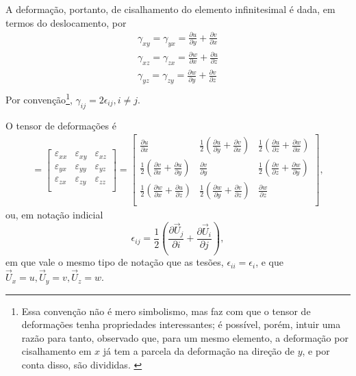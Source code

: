 A deformação, portanto, de cisalhamento do elemento infinitesimal é dada, em termos do deslocamento, por
\begin{gather}
        \gamma_{xy} = \gamma_{yx} = \frac{\partial u}{\partial y} + \frac{\partial v}{\partial x} \\
        \gamma_{xz} = \gamma_{zx} = \frac{\partial w}{\partial x} + \frac{\partial u}{\partial z} \\
        \gamma_{yz} = \gamma_{zy} = \frac{\partial w}{\partial y} + \frac{\partial v}{\partial z} \\
\end{gather}
Por convenção\footnote{Essa convenção não é mero simbolismo, mas faz com que o tensor de deformações tenha propriedades interessantes; é possível, porém, intuir uma razão para tanto, observado que, para um mesmo elemento, a deformação por cisalhamento em $x$ já tem a parcela da deformação na direção de $y$, e por conta disso, são divididas. \cite{popov} }, $\gamma_{ij} = 2 \epsilon_{ij}, i \neq j$.\cite{roylance} 

O tensor de deformações é
\begin{gather}
    [\mathbf{\epsilon}] = 
    \begin{bmatrix}
        \varepsilon_{xx} & \varepsilon_{xy} & \varepsilon_{xz} \\
        \varepsilon_{yx} & \varepsilon_{yy} & \varepsilon_{yz} \\
        \varepsilon_{zx} & \varepsilon_{zy} & \varepsilon_{zz} \\
    \end{bmatrix}
        =
    \begin{bmatrix}
        \frac{\partial u}{\partial x} & \frac{1}{2} \left(\frac{\partial u}{\partial y}+\frac{\partial v}{\partial x}\right) & \frac{1}{2} \left(\frac{\partial u}{\partial z}+\frac{\partial w}{\partial x}\right) \\
        \frac{1}{2} \left(\frac{\partial v}{\partial x}+\frac{\partial u}{\partial y}\right) & \frac{\partial v}{\partial y} & \frac{1}{2} \left(\frac{\partial v}{\partial z}+\frac{\partial w}{\partial y}\right) \\
        \frac{1}{2} \left(\frac{\partial w}{\partial x}+\frac{\partial u}{\partial z}\right) & \frac{1}{2} \left(\frac{\partial w}{\partial y}+\frac{\partial v}{\partial z}\right) & \frac{\partial w}{\partial z} \\
    \end{bmatrix},
\end{gather}
ou, em notação indicial
\begin{equation}
    \epsilon_{ij} = \frac{1}{2} \left(\frac{\partial \vec{U}_j}{\partial i} + \frac{\partial \vec{U}_i}{\partial j}\right),
\end{equation}
em que vale o mesmo tipo de notação que as tesões, $\epsilon_{ii} = \epsilon_i$, e que $\vec{U}_x = u, \vec{U}_y = v, \vec{U}_z = w$.

